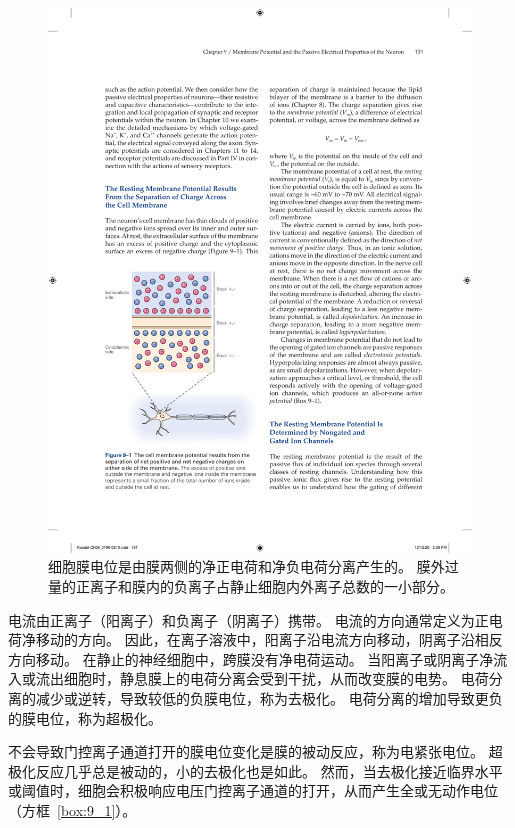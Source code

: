 \begin{figure}[htbp]
	\centering
	\includegraphics[width=0.5\linewidth]{chap09/fig_9_1}
	\caption{细胞膜电位是由膜两侧的净正电荷和净负电荷分离产生的。 膜外过量的正离子和膜内的负离子占静止细胞内外离子总数的一小部分。}
	\label{fig:9_1}
\end{figure}


电流由正离子（阳离子）和负离子（阴离子）携带。
电流的方向通常定义为正电荷净移动的方向。
因此，在离子溶液中，阳离子沿电流方向移动，阴离子沿相反方向移动。
在静止的神经细胞中，跨膜没有净电荷运动。
当阳离子或阴离子净流入或流出细胞时，静息膜上的电荷分离会受到干扰，从而改变膜的电势。
电荷分离的减少或逆转，导致较低的负膜电位，称为去极化。
电荷分离的增加导致更负的膜电位，称为超极化。


不会导致门控离子通道打开的膜电位变化是膜的被动反应，称为电紧张电位。
超极化反应几乎总是被动的，小的去极化也是如此。
然而，当去极化接近临界水平或阈值时，细胞会积极响应电压门控离子通道的打开，从而产生全或无动作电位（方框~\ref{box:9_1}）。


